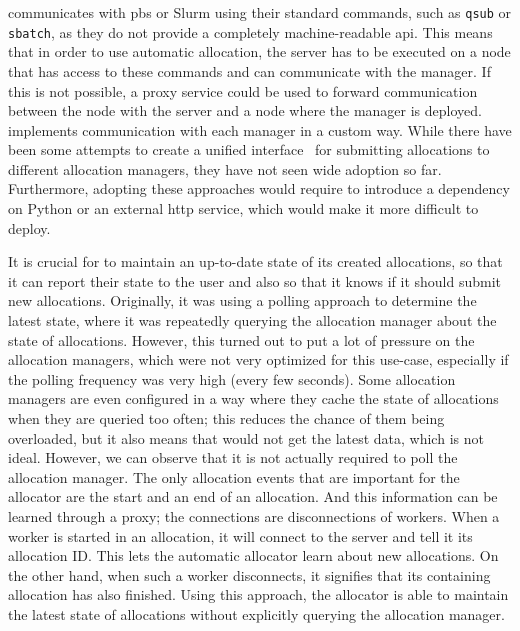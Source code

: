 \hyperqueue{} communicates with \gls{pbs} or Slurm using their standard
commands, such as \texttt{qsub} or \texttt{sbatch}, as they do not provide a
completely machine-readable \gls{api}. This means that in order to use automatic
allocation, the server has to be executed on a node that has access to these commands and can
communicate with the manager. If this is not possible, a proxy service could be used to forward
communication between the node with the server and a node where the manager is deployed.
\hyperqueue{} implements communication with each manager in a custom way. While there
have been some attempts to create a unified interface~\cite{psij,workflow-alloc-manager-comm} for submitting
allocations to different allocation managers, they have not seen wide adoption so far. Furthermore,
adopting these approaches would require \hq{} to introduce a dependency on Python
or an external \gls{http} service, which would make it more difficult to deploy.

It is crucial for \autoalloc{} to maintain an up-to-date state of its created
allocations, so that it can report their state to the user and also so that it knows if it should
submit new allocations. Originally, it was using a polling approach to determine the latest state,
where it was repeatedly querying the allocation manager about the state of allocations. However,
this turned out to put a lot of pressure on the allocation managers, which were not very optimized
for this use-case, especially if the polling frequency was very high (every few seconds). Some
allocation managers are even configured in a way where they cache the state of allocations when
they are queried too often; this reduces the chance of them being overloaded, but it also means
that \hyperqueue{} would not get the latest data, which is not ideal. However, we can
observe that it is not actually required to poll the allocation manager. The only allocation events
that are important for the allocator are the start and an end of an allocation. And this
information can be learned through a proxy; the connections are disconnections of
\hq{} workers. When a worker is started in an allocation, it will connect to the
server and tell it its allocation ID\@. This lets the automatic allocator learn about new
allocations. On the other hand, when such a worker disconnects, it signifies that its containing
allocation has also finished. Using this approach, the allocator is able to maintain the latest
state of allocations without explicitly querying the allocation manager.

